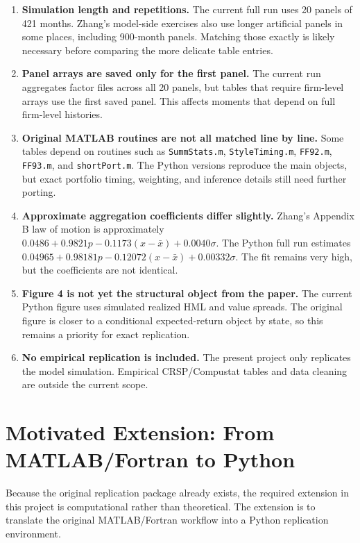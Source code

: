 \documentclass[11pt]{article}
\begin{document}
\begin{enumerate}
  \item \textbf{Simulation length and repetitions.} The current full run uses 20 panels of 421 months. Zhang's model-side exercises also use longer artificial panels in some places, including 900-month panels. Matching those exactly is likely necessary before comparing the more delicate table entries.
  \item \textbf{Panel arrays are saved only for the first panel.} The current run aggregates factor files across all 20 panels, but tables that require firm-level arrays use the first saved panel. This affects moments that depend on full firm-level histories.
  \item \textbf{Original MATLAB routines are not all matched line by line.} Some tables depend on routines such as \texttt{SummStats.m}, \texttt{StyleTiming.m}, \texttt{FF92.m}, \texttt{FF93.m}, and \texttt{shortPort.m}. The Python versions reproduce the main objects, but exact portfolio timing, weighting, and inference details still need further porting.
  \item \textbf{Approximate aggregation coefficients differ slightly.} Zhang's Appendix B law of motion is approximately \(0.0486 + 0.9821p - 0.1173(x-\bar{x}) + 0.0040\sigma\). The Python full run estimates \(0.04965 + 0.98181p - 0.12072(x-\bar{x}) + 0.00332\sigma\). The fit remains very high, but the coefficients are not identical.
  \item \textbf{Figure 4 is not yet the structural object from the paper.} The current Python figure uses simulated realized HML and value spreads. The original figure is closer to a conditional expected-return object by state, so this remains a priority for exact replication.
  \item \textbf{No empirical replication is included.} The present project only replicates the model simulation. Empirical CRSP/Compustat tables and data cleaning are outside the current scope.
\end{enumerate}

\section{Motivated Extension: From MATLAB/Fortran to Python}

Because the original replication package already exists, the required extension in this project is computational rather than theoretical. The extension is to translate the original MATLAB/Fortran workflow into a Python replication environment.
\end{document}
